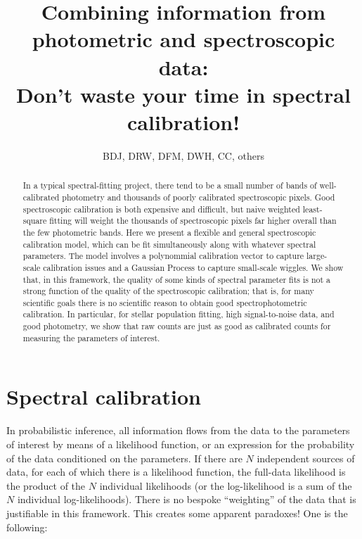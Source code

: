 \documentclass[iop,numberedappendix]{emulateapj}
\begin{document}
\title{Combining information from photometric and spectroscopic data:\\
  Don't waste your time in spectral calibration!}
\author{BDJ, DRW, DFM, DWH, CC, others}

\begin{abstract}
In a typical spectral-fitting project,
  there tend to be a small number of bands of well-calibrated photometry
  and thousands of poorly calibrated spectroscopic pixels.
Good spectroscopic calibration is both expensive and difficult,
  but naive weighted least-square fitting will weight
  the thousands of spectroscopic pixels far higher overall
  than the few photometric bands.
Here we present a flexible and general spectroscopic calibration model,
  which can be fit simultaneously along with whatever spectral parameters.
The model involves a polynommial calibration vector to capture large-scale calibration issues
  and a Gaussian Process to capture small-scale wiggles.
We show that, in this framework, the quality of some kinds of spectral parameter fits
  is not a strong function of the quality of the spectroscopic calibration;
  that is, for many scientific goals there is no scientific reason
  to obtain good spectrophotometric calibration.
In particular, for stellar population fitting, high signal-to-noise data,
  and good photometry,
  we show that raw counts are just as good as calibrated counts for measuring the
  parameters of interest.
\end{abstract}


\section{Spectral calibration}

In probabilistic inference, all information flows from the data to the
parameters of interest by means of a likelihood function, or an
expression for the probability of the data conditioned on the
parameters.
If there are $N$ independent sources of data, for each of which there
is a likelihood function, the full-data likelihood is the product of
the $N$ individual likelihoods (or the log-likelihood is a sum of the
$N$ individual log-likelihoods).
There is no bespoke ``weighting'' of the data that is justifiable in
this framework.
This creates some apparent paradoxes!
One is the following:
\end{document}

